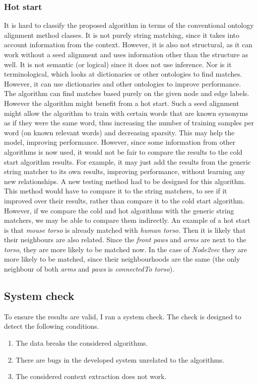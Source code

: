 \documentclass{article}
\begin{document}
  \subsubsection{Hot start}
  It is hard to classify the proposed algorithm in terms of the conventional ontology alignment method classes. It is not purely string matching, since it takes into account information from the context. However, it is also not structural, as it can work without a seed alignment and uses information other than the structure as well. It is not semantic (or logical) since it does not use inference. Nor is it terminological, which looks at dictionaries or other ontologies to find matches. However, it can use dictionaries and other ontologies to improve performance.
  The algorithm can find matches based purely on the given node and edge labels. However the algorithm might benefit from a hot start. Such a seed alignment might allow the algorithm to train with certain words that are known synonyms as if they were the same word, thus increasing the number of training samples per word (on known relevant words) and decreasing sparsity. This may help the model, improving performance. However, since some information from other algorithms is now used, it would not be fair to compare the results to the cold start algorithm results. For example, it may just add the results from the generic string matcher to its own results, improving performance, without learning any new relationships. A new testing method had to be designed for this algorithm. This method would have to compare it to the string matchers, to see if it improved over their results, rather than compare it to the cold start algorithm. However, if we compare the cold and hot algorithms with the generic string matchers, we may be able to compare them indirectly.
  An example of a hot start is that \emph{mouse torso} is already matched with \emph{human torso}. Then it is likely that their neighbours are also related. Since the \emph{front paws} and \emph{arms} are next to the \emph{torso}, they are more likely to be matched now. In the case of \emph{Node2vec} they are more likely to be matched, since their neighbourhoods are the same (the only neighbour of both \emph{arms} and \emph{paws} is \emph{connectedTo torso}).
 
 \subsection{System check}
 To ensure the results are valid, I ran a system check. The check is designed to detect the following conditions.
  \begin{enumerate}
  \item The data breaks the considered algorithms.
  \item There are bugs in the developed system unrelated to the algorithms.
  \item The considered context extraction does not work.
  \end{enumerate}
  
\end{document}
